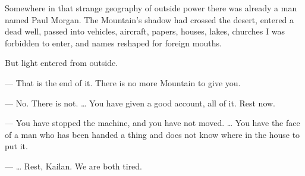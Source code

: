 Somewhere in that strange geography of outside power there was already a man named Paul Morgan. The Mountain's shadow had crossed the desert, entered a dead well, passed into vehicles, aircraft, papers, houses, lakes, churches I was forbidden to enter, and names reshaped for foreign mouths.\par

But light entered from outside.\par

\ornament

\begin{room}

--- That is the end of it. There is no more Mountain to give you.

--- No. There is not. \ldots{} You have given a good account, all of it. Rest now.

--- You have stopped the machine, and you have not moved. \ldots{} You have the face of a man who has been handed a thing and does not know where in the house to put it.

--- \ldots{} Rest, Kailan. We are both tired.

\end{room}

\ornament
